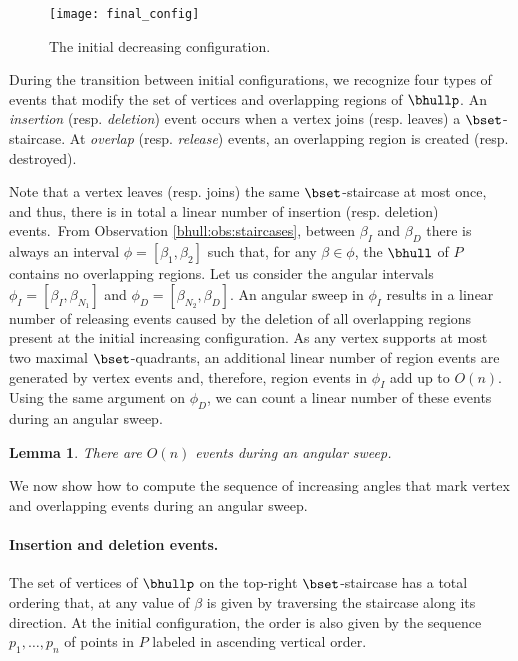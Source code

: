 \documentclass[11pt,letterpaper,english]{article}
\newtheorem{lemma}{Lemma}
\theoremstyle{definition}
\begin{document}
\begin{figure}[ht]
  \centering
  \begin{minipage}{0.9\textwidth}
    \centering
    \texttt{[image: final\_config]}
    \caption{The initial decreasing configuration.}
    \label{bhull:fig:final_config}
  \end{minipage}
\end{figure}

During the transition between initial configurations, we recognize
four types of events that modify the set of vertices and overlapping
regions of $\bhullp$. An \emph{insertion} (resp. \emph{deletion})
event occurs when a vertex joins (resp. leaves) a
$\bset$-staircase. At \emph{overlap} (resp. \emph{release}) events, an
overlapping region is created (resp. destroyed).

Note that a vertex leaves (resp. joins) the same $\bset$-staircase at
most once, and thus, there is in total a linear number of insertion
(resp. deletion) events.~From Observation \ref{bhull:obs:staircases},
between $\beta_I$ and $\beta_D$ there is always an interval
$\phi = \left[ \beta_{1}, \beta_{2} \right]$ such that, for any
$\beta \in \phi$, the $\bhull$ of $P$ contains no overlapping
regions. Let us consider the angular intervals
$\phi_I = [\beta_I,\beta_{N_1}]$ and $\phi_D = [\beta_{N_2},\beta_D]$.
An angular sweep in $\phi_I$ results in a linear number of releasing
events caused by the deletion of all overlapping regions present at
the initial increasing configuration. As any vertex supports at most
two maximal $\bset$-quadrants, an additional linear number of region
events are generated by vertex events and, therefore, region events in
$\phi_I$ add up to $O(n)$. Using the same argument on $\phi_D$, we can
count a linear number of these events during an angular sweep.

\begin{lemma}\label{bhull:lemma:linear_events}
  There are $O(n)$ events during an angular sweep.
\end{lemma}

We now show how to compute the sequence of increasing angles that mark
vertex and overlapping events during an angular sweep.

\paragraph{Insertion and deletion events.}

The set of vertices of $\bhullp$ on the top-right $\bset$-staircase
has a total ordering that, at any value of $\beta$ is given by
traversing the staircase along its direction. At the
initial configuration, the order is also given by the sequence
$p_1,\ldots,p_n$ of points in $P$ labeled in ascending vertical
order.
\end{document}
